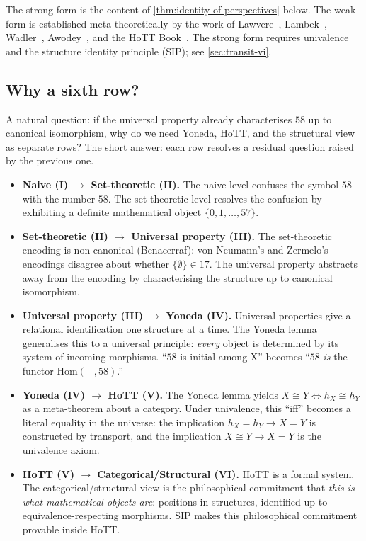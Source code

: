 \documentclass[12pt]{article}
\theoremstyle{definition}
\theoremstyle{remark}
\newcommand{\Hom}{\mathrm{Hom}}
\newcommand{\iso}{\cong}
\begin{document}
The strong form is the content of \cref{thm:identity-of-perspectives}
below. The weak form is established meta-theoretically by the work of
Lawvere~\cite{Lawvere1964}, Lambek~\cite{Lambek1972}, Wadler~\cite{Wadler2015},
Awodey~\cite{Awodey2014}, and the HoTT Book~\cite{HoTTBook}. The strong
form requires univalence and the structure identity principle (SIP); see
\cref{sec:transit-vi}.

\subsection{Why a sixth row?}

A natural question: if the universal property already characterises $58$ up
to canonical isomorphism, why do we need Yoneda, HoTT, and the structural
view as separate rows? The short answer: each row resolves a residual
question raised by the previous one.

\begin{itemize}
\item \textbf{Naive (I) $\to$ Set-theoretic (II).} The naive level confuses
the symbol $58$ with the number $58$. The set-theoretic level resolves the
confusion by exhibiting a definite mathematical object
$\{0, 1, \ldots, 57\}$.
\item \textbf{Set-theoretic (II) $\to$ Universal property (III).} The
set-theoretic encoding is non-canonical (Benacerraf): von Neumann's and
Zermelo's encodings disagree about whether $\{\emptyset\} \in 17$. The
universal property abstracts away from the encoding by characterising the
structure up to canonical isomorphism.
\item \textbf{Universal property (III) $\to$ Yoneda (IV).} Universal
properties give a relational identification one structure at a time. The
Yoneda lemma generalises this to a universal principle: \emph{every} object
is determined by its system of incoming morphisms. ``$58$ is initial-among-X''
becomes ``$58$ \emph{is} the functor $\Hom(-, 58)$.''
\item \textbf{Yoneda (IV) $\to$ HoTT (V).} The Yoneda lemma yields
$X \iso Y \iff h_X \iso h_Y$ as a meta-theorem about a category. Under
univalence, this ``iff'' becomes a literal equality in the universe: the
implication $h_X = h_Y \to X = Y$ is constructed by transport, and the
implication $X \iso Y \to X = Y$ is the univalence axiom.
\item \textbf{HoTT (V) $\to$ Categorical/Structural (VI).} HoTT is a formal
system. The categorical/structural view is the philosophical commitment
that \emph{this is what mathematical objects are}: positions in structures,
identified up to equivalence-respecting morphisms. SIP makes this
philosophical commitment provable inside HoTT.
\end{itemize}
\end{document}
